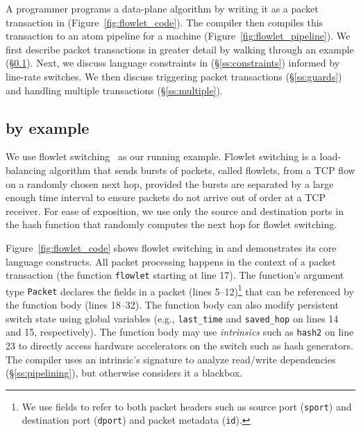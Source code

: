 A programmer programs a data-plane algorithm by writing it as
a packet transaction in \pktlanguage (Figure~\ref{fig:flowlet_code}).  The
\pktlanguage compiler then compiles this transaction to an atom pipeline for a
\absmachine machine (Figure~\ref{fig:flowlet_pipeline}). We first describe
packet transactions in greater detail by walking through an example
(\S\ref{ss:flowlet}). Next, we discuss language constraints in \pktlanguage
(\S\ref{ss:constraints}) informed by line-rate switches.  We then discuss
triggering packet transactions (\S\ref{ss:guards}) and handling multiple
transactions (\S\ref{ss:multiple}).

\subsection{\pktlanguage by example}
\label{ss:flowlet}

We use flowlet switching~\cite{flowlets} as our running example. Flowlet
switching is a load-balancing algorithm that sends bursts of packets, called
flowlets, from a TCP flow on a randomly chosen next hop, provided the bursts
are separated by a large enough time interval to ensure packets do not arrive
out of order at a TCP receiver. For ease of exposition, we use only the source
and destination ports in the hash function that randomly computes the next hop
for flowlet switching.

Figure~\ref{fig:flowlet_code} shows flowlet switching in \pktlanguage and
demonstrates its core language constructs. All packet processing happens in the
context of a packet transaction (the function \texttt{flowlet} starting at line
17). The function's argument type {\tt Packet} declares the fields in a packet
(lines 5--12)\footnote{We use fields to refer to both packet headers such as
source port ({\tt sport}) and destination port ({\tt dport}) and packet
metadata ({\tt id}).} that can be referenced by the function body (lines
18--32).  The function body can also modify persistent switch state using
global variables (e.g., \texttt{last\_time} and \texttt{saved\_hop} on lines 14
and 15, respectively). The function body may use \textit{intrinsics} such as
\texttt{hash2} on line 23 to directly access hardware accelerators on the
switch such as hash generators.  The \pktlanguage compiler uses an intrinsic's
signature to analyze read/write dependencies (\S\ref{ss:pipelining}), but otherwise considers it a blackbox.


